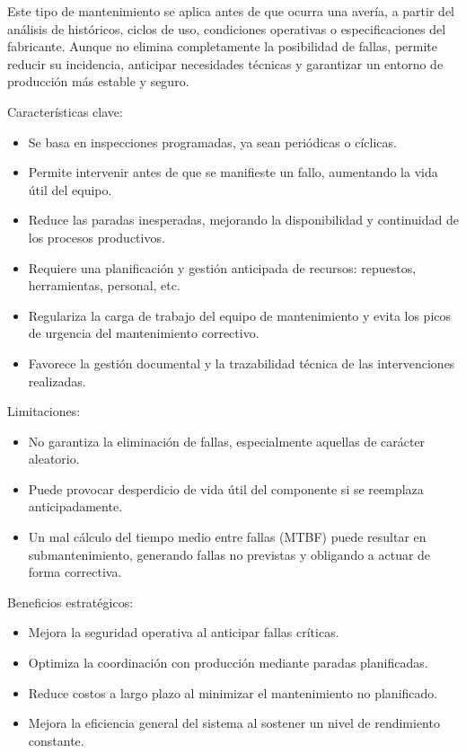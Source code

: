 \documentclass[a4paper,oneside,11pt]{article}
\begin{document}
\begin{enumerate}
    Este tipo de mantenimiento se aplica antes de que ocurra una avería, a partir del análisis de históricos, ciclos de uso, condiciones operativas o especificaciones del fabricante. Aunque no elimina completamente la posibilidad de fallas, permite reducir su incidencia, anticipar necesidades técnicas y garantizar un entorno de producción más estable y seguro.  

    Características clave:
    \begin{itemize}
        \item Se basa en inspecciones programadas, ya sean periódicas o cíclicas.
        \item Permite intervenir antes de que se manifieste un fallo, aumentando la vida útil del equipo.
        \item Reduce las paradas inesperadas, mejorando la disponibilidad y continuidad de los procesos productivos.
        \item Requiere una planificación y gestión anticipada de recursos: repuestos, herramientas, personal, etc.
        \item Regulariza la carga de trabajo del equipo de mantenimiento y evita los picos de urgencia del mantenimiento correctivo.
        \item Favorece la gestión documental y la trazabilidad técnica de las intervenciones realizadas.
    \end{itemize}

    Limitaciones: 
    \begin{itemize}
        \item No garantiza la eliminación de fallas, especialmente aquellas de carácter aleatorio.
        \item Puede provocar desperdicio de vida útil del componente si se reemplaza anticipadamente.
        \item Un mal cálculo del tiempo medio entre fallas (MTBF) puede resultar en submantenimiento, generando fallas no previstas y obligando a actuar de forma correctiva.
    \end{itemize}

    Beneficios estratégicos:
    \begin{itemize}
        \item Mejora la seguridad operativa al anticipar fallas críticas.
        \item Optimiza la coordinación con producción mediante paradas planificadas.
        \item Reduce costos a largo plazo al minimizar el mantenimiento no planificado.
        \item Mejora la eficiencia general del sistema al sostener un nivel de rendimiento constante.
    \end{itemize}


\end{enumerate}
\end{document}
